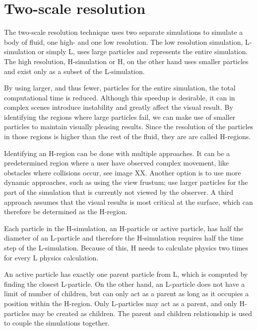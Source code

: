 \documentclass[../../main.tex]{subfiles}
\begin{document}
\tracingall

    
    
\section{Two-scale resolution}
The two-scale resolution technique uses two separate simulations to simulate a body of fluid, one high- and one low resolution. The low resolution simulation, L-simulation or simply L, uses large particles and represents the entire simulation. The high resolution, H-simulation or H, on the other hand uses smaller particles and exist only as a subset of the L-simulation. 

By using larger, and thus fewer, particles for the entire simulation, the total computational time is reduced. Although this speedup is desirable, it can in complex scenes introduce instability and greatly affect the visual result. By identifying the regions where large particles fail, we can make use of smaller particles to maintain visually pleasing results. Since the resolution of the particles in those regions is higher than the rest of the fluid, they are are called H-regions.

Identifying an H-region can be done with multiple approaches. It can be a predetermined region where a user have observed complex movement, like obstacles where collisions occur, see image XX. Another option is to use more dynamic approaches, such as using the view frustum; use larger particles for the part of the simulation that is currently not viewed by the observer. A third approach assumes that the visual results is most critical at the surface, which can therefore be determined as the H-region.

Each particle in the H-simulation, an H-particle or active particle, has half the diameter of an L-particle and therefore the H-simulation requires half the time step of the L-simulation. Because of this, H needs to calculate physics two times for every L physics calculation. 

An active particle has exactly one parent particle from L, which is computed by finding the closest L-particle. On the other hand, an L-particle does not have a limit of number of children, but can only act as a parent as long as it occupies a position within the H-region. Only L-particles may act as a parent, and only H-particles may be created as children. The parent and children relationship is used to couple the simulations together. %
\end{document}
